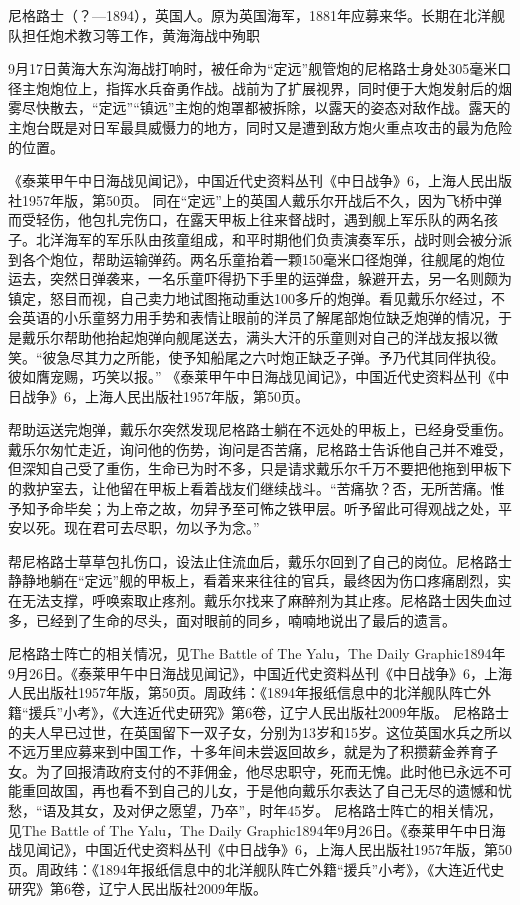 \documentclass[12pt,UTF8]{ctexbook}
\begin{document}
尼格路士（？—1894），英国人。原为英国海军，1881年应募来华。长期在北洋舰队担任炮术教习等工作，黄海海战中殉职

9月17日黄海大东沟海战打响时，被任命为“定远”舰管炮的尼格路士身处305毫米口径主炮炮位上，指挥水兵奋勇作战。战前为了扩展视界，同时便于大炮发射后的烟雾尽快散去，“定远”“镇远”主炮的炮罩都被拆除，以露天的姿态对敌作战。露天的主炮台既是对日军最具威慑力的地方，同时又是遭到敌方炮火重点攻击的最为危险的位置。

《泰莱甲午中日海战见闻记》，中国近代史资料丛刊《中日战争》6，上海人民出版社1957年版，第50页。
同在“定远”上的英国人戴乐尔开战后不久，因为飞桥中弹而受轻伤，他包扎完伤口，在露天甲板上往来督战时，遇到舰上军乐队的两名孩子。北洋海军的军乐队由孩童组成，和平时期他们负责演奏军乐，战时则会被分派到各个炮位，帮助运输弹药。两名乐童抬着一颗150毫米口径炮弹，往舰尾的炮位运去，突然日弹袭来，一名乐童吓得扔下手里的运弹盘，躲避开去，另一名则颇为镇定，怒目而视，自己卖力地试图拖动重达100多斤的炮弹。看见戴乐尔经过，不会英语的小乐童努力用手势和表情让眼前的洋员了解尾部炮位缺乏炮弹的情况，于是戴乐尔帮助他抬起炮弹向舰尾送去，满头大汗的乐童则对自己的洋战友报以微笑。“彼急尽其力之所能，使予知船尾之六吋炮正缺乏子弹。予乃代其同伴执役。彼如膺宠赐，巧笑以报。” 《泰莱甲午中日海战见闻记》，中国近代史资料丛刊《中日战争》6，上海人民出版社1957年版，第50页。

帮助运送完炮弹，戴乐尔突然发现尼格路士躺在不远处的甲板上，已经身受重伤。戴乐尔匆忙走近，询问他的伤势，询问是否苦痛，尼格路士告诉他自己并不难受，但深知自己受了重伤，生命已为时不多，只是请求戴乐尔千万不要把他拖到甲板下的救护室去，让他留在甲板上看着战友们继续战斗。“苦痛欤？否，无所苦痛。惟予知予命毕矣；为上帝之故，勿舁予至可怖之铁甲层。听予留此可得观战之处，平安以死。现在君可去尽职，勿以予为念。”

帮尼格路士草草包扎伤口，设法止住流血后，戴乐尔回到了自己的岗位。尼格路士静静地躺在“定远”舰的甲板上，看着来来往往的官兵，最终因为伤口疼痛剧烈，实在无法支撑，呼唤索取止疼剂。戴乐尔找来了麻醉剂为其止疼。尼格路士因失血过多，已经到了生命的尽头，面对眼前的同乡，喃喃地说出了最后的遗言。

尼格路士阵亡的相关情况，见The Battle of The Yalu，The Daily Graphic1894年9月26日。《泰莱甲午中日海战见闻记》，中国近代史资料丛刊《中日战争》6，上海人民出版社1957年版，第50页。周政纬：《1894年报纸信息中的北洋舰队阵亡外籍“援兵”小考》，《大连近代史研究》第6卷，辽宁人民出版社2009年版。
尼格路士的夫人早已过世，在英国留下一双子女，分别为13岁和15岁。这位英国水兵之所以不远万里应募来到中国工作，十多年间未尝返回故乡，就是为了积攒薪金养育子女。为了回报清政府支付的不菲佣金，他尽忠职守，死而无愧。此时他已永远不可能重回故国，再也看不到自己的儿女，于是他向戴乐尔表达了自己无尽的遗憾和忧愁，“语及其女，及对伊之愿望，乃卒”，时年45岁。 尼格路士阵亡的相关情况，见The Battle of The Yalu，The Daily Graphic1894年9月26日。《泰莱甲午中日海战见闻记》，中国近代史资料丛刊《中日战争》6，上海人民出版社1957年版，第50页。周政纬：《1894年报纸信息中的北洋舰队阵亡外籍“援兵”小考》，《大连近代史研究》第6卷，辽宁人民出版社2009年版。
\end{document}
